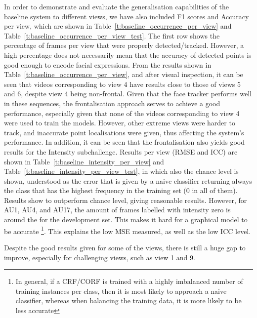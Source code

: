 \documentclass[a4paper, 10pt, conference]{ieeeconf}      \usepackage{FG2017}
\begin{document}
In order to demonstrate and evaluate the generalisation capabilities of the baseline system to different views, we have also included F1 scores and Accuracy per view, which are shown in Table~\ref{t:baseline_occurrence_per_view} and Table~\ref{t:baseline_occurrence_per_view_test}. The first row shows the percentage of frames per view that were properly detected/tracked. However, a high percentage does not necessarily mean that the accuracy of detected points is good enough to encode facial expressions. From the results shown in Table~\ref{t:baseline_occurrence_per_view}, and after visual inspection, it can be seen that videos corresponding to view 4 have results close to those of views 5 and 6, despite view 4 being non-frontal. Given that the face tracker performs well in these sequences, the frontalisation approach serves to achieve a good performance, especially given that none of the videos corresponding to view 4 were used to train the models. However, other extreme views were harder to track, and inaccurate point localisations were given, thus affecting the system's performance.  
In addition, it can be seen that the frontalisation also yields good results for the Intensity subchallenge. Results per view (RMSE and ICC) are shown in Table~\ref{t:baseline_intensity_per_view} and Table~\ref{t:baseline_intensity_per_view_test}, in which also the chance level is shown, understood as the error that is given by a naive classifier returning always the class that has the highest frequency in the training set (0 in all of them). Results show to outperform chance level, giving reasonable results. However, for AU1, AU4, and AU17, the amount of frames labelled with intensity zero is around the  for the development set. This makes it hard for a graphical model to be accurate \footnote{In general, if a CRF/CORF is trained with a highly imbalanced number of training instances per class, then it is most likely to approach a naive classifier, whereas when balancing the training data, it is more likely to be less accurate}. This explains the low MSE measured, as well as the low ICC level. 

Despite the good results given for some of the views, there is still a huge gap to improve, especially for challenging views, such as view 1 and 9.
\end{document}
